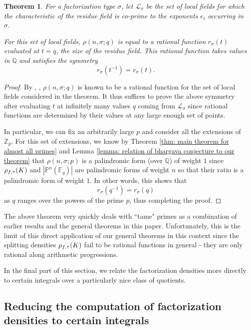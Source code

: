 \documentclass[10pt]{article}
\theoremstyle{plain}
\newtheorem{thm}[theorem]{Theorem}
\theoremstyle{definition}
\numberwithin{equation}{section}
\begin{document}
\begin{thm}\label{thm: symmetry follows from rationality for factorization densities}
    For a factorization type $\sigma$, let $\mathcal L_\sigma$ be the set of local fields for which the characteristic of the residue field is co-prime to the exponents $e_i$ occurring in $\sigma$. 
    
    For this set of local fields, $\rho(n,\sigma;q)$ is equal to a rational function $r_\sigma(t)$ evaluated at $t = q$, the size of the residue field. This rational function takes values in $\mathbb Q$ and satisfies the symmetry
    \[r_\sigma(t^{-1}) = r_\sigma(t).\]
\end{thm}
\begin{proof}
    By \cite{john}, \cite{del_corso_dvornicich_2000}, $\rho(n,\sigma;q)$ is known to be a rational function for the set of local fields considered in the theorem. It thus suffices to prove the above symmetry after evaluating $t$ at infinitely many values $q$ coming from $\mathcal L_\sigma$  since rational functions are determined by their values at any large enough set of points. 
    
    In particular, we can fix an arbitrarily large $p$ and consider all the extensions of $\mathbb Z_p$. For this set of extensions, we know by Theorem \ref{thm: main theorem for almost all primes} and Lemma \ref{lemma: relation of bhargava conjecture to our theorem} that $\rho(n,\sigma;p)$ is a palindromic form (over $\mathbb Q$) of weight $1$ since $\rho_{f,\tau}(K)$ and $|\mathbb P^n(\mathbb F_q)|$ are palindromic forms of weight $n$ so that their ratio is a palindromic form of weight $1$. In other words, this shows that
    \[r_\sigma(q^{-1}) = r_\sigma(q)\]
    as $q$ ranges over the powers of the prime $p$, thus completing the proof.
\end{proof}

The above theorem very quickly deals with ``tame" primes as a combination of earlier results and the general theorems in this paper. Unfortunately, this is the limit of this direct application of our general theorems in this context since the splitting densities $\rho_{f,\tau}(K)$ fail to be rational functions in general - they are only rational along arithmetic progressions. 

In the final part of this section, we relate the factorization densities more directly to certain integrals over a particularly nice class of quotients. 

\subsection{Reducing the computation of factorization densities to certain integrals}\label{sec: relating factorization densities to integrals}
\end{document}
